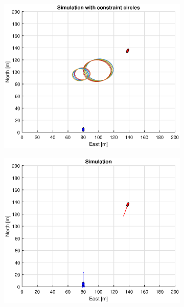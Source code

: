 \begin{figure}[!b]
\begin{subfigure}[b]{0.499\textwidth}
    \end{subfigure}
    \hfill
    \\
    \begin{subfigure}[b]{0.49\textwidth}
        \centering
        \includegraphics[width=\textwidth]{Images/Figures/sving_GW/Simple0_f1_Frame2}
    \end{subfigure}
    \hfill
    \begin{subfigure}[b]{0.499\textwidth}
        \centering
        \includegraphics[width=\textwidth]{Images/Figures/sving_GW/Simple0_f600_Frame2}

\end{subfigure}
\end{figure}

